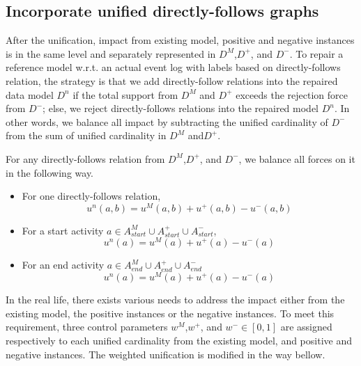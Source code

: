 \subsection{Incorporate unified directly-follows graphs}
After the unification, impact from existing model, positive and negative instances is in the same level and separately represented in $D^M$,$D^+$, and $D^-$. 
To repair a reference model w.r.t. an actual event log with labels based on directly-follows relation, the strategy is that we add directly-follow relations into the repaired data model $D^n$ if the total support from $D^M$ and $D^+$ exceeds the rejection force from $D^-$; else, we reject directly-follows relations into the repaired model $D^n$. In other words, we balance all impact by subtracting the unified cardinality of $D^-$ from the sum of unified cardinality in $D^M$ and$D^+$.
\begin{definition} For any directly-follows relation from $D^M$,$D^+$, and $D^-$, we balance all forces on it in the following way. 
	\begin{itemize}
		\item For one directly-follows relation, \[ u^{n}(a,b) =  u^{M}(a,b)+ u^{+}(a,b)  - u^{-}(a,b) \] 
		\item For a start activity $a \in A^{M}_{start} \cup A^{+}_{start} \cup A^{-}_{start}$,
		\[ u^{n}(a) =  u^{M}(a)+ u^{+}(a)  - u^{-}(a)\]
		\item For an end activity $a \in A^{M}_{end} \cup A^{+}_{end} \cup A^{-}_{end}$
		\[ u^{n}(a) =  u^{M}(a)+ u^{+}(a)  - u^{-}(a)  \]
	\end{itemize}	
\end{definition}
In the real life, there exists various needs to address the impact either from the existing model, the positive instances or the negative instances. To meet this requirement, three control parameters $w^{M}$,$w^{+}$, and $w^{-} \in [0,1]$ are assigned respectively to each unified cardinality from the existing model, and positive and negative instances. The weighted unification is modified in the way bellow. 

